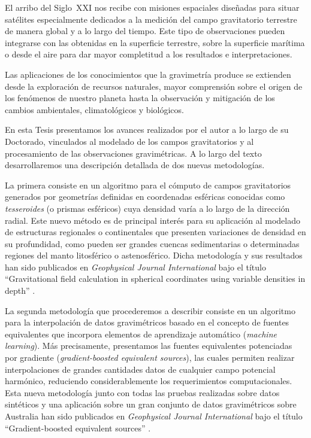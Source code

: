 El arribo del Siglo~XXI nos recibe con misiones espaciales
diseñadas para situar satélites especialmente dedicados a la medición del campo
gravitatorio terrestre de manera global y a lo largo del tiempo.
Este tipo de observaciones pueden integrarse con las obtenidas en la superficie
terrestre, sobre la superficie marítima o desde el aire para dar mayor
completitud a los resultados e interpretaciones.

Las aplicaciones de los conocimientos que la gravimetría produce se extienden
desde la exploración de recursos naturales, mayor comprensión sobre el origen
de los fenómenos de nuestro planeta hasta la observación y mitigación de los
cambios ambientales, climatológicos y biológicos.

En esta Tesis presentamos los avances realizados por el autor a lo largo de su
Doctorado, vinculados al modelado de los campos gravitatorios y al
procesamiento de las observaciones gravimétricas.
A lo largo del texto desarrollaremos una descripción detallada de dos nuevas
metodologías.

La primera consiste en un algoritmo para el cómputo de campos gravitatorios
generados por geometrías definidas en coordenadas esféricas conocidas como
\emph{tesseroides} (o prismas esféricos) cuya densidad varía a lo largo de la
dirección radial.
Este nuevo método es de principal interés para su aplicación al modelado de
estructuras regionales o continentales que presenten variaciones de densidad en
su profundidad, como pueden ser grandes cuencas sedimentarias o determinadas
regiones del manto litosférico o astenosférico.
Dicha metodología y sus resultados han sido publicados en \emph{Geophysical
Journal International} bajo el título ``Gravitational field calculation in
spherical coordinates using variable densities in depth'' \citep{soler2019}.

La segunda metodología que procederemos a describir consiste en un algoritmo
para la interpolación de datos gravimétricos basado en el concepto de fuentes
equivalentes que incorpora elementos de aprendizaje automático (\emph{machine
learning}).
Más precisamente, presentamos las fuentes equivalentes potenciadas por
gradiente (\emph{gradient-boosted equivalent sources}), las cuales permiten
realizar interpolaciones de grandes cantidades datos de cualquier campo
potencial harmónico, reduciendo considerablemente los requerimientos
computacionales.
Esta nueva metodología junto con todas las pruebas realizadas sobre datos
sintéticos y una aplicación sobre un gran conjunto de datos gravimétricos sobre
Australia han sido publicados en \emph{Geophysical Journal International} bajo
el título ``Gradient-boosted equivalent sources'' \citep{soler2021}.

